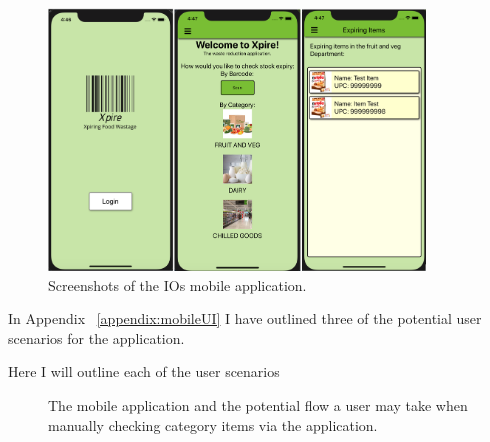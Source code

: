 \documentclass[a4paper,11pt]{report}
\begin{document}
\begin{figure}[H]
    \centering
    \includegraphics[width=10cm]{./assets/images/appUI.png}
    \caption{Screenshots of the IOs mobile application.}
    \label{fig:IOSScreenshots}
\end{figure}

In Appendix ~\ref{appendix:mobileUI} I have outlined three of the potential user scenarios for the application.

Here I will outline each of the user scenarios


\begin{figure}[H]
    \centering
    \caption{The mobile application and the potential flow a user may take when manually checking category items via the application.}
    \label{appendix:scenario1small}
\end{figure}
\end{document}
